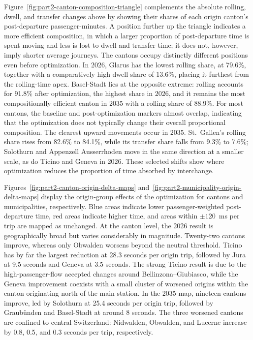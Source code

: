 \documentclass[preprint,12pt]{elsarticle}
\begin{document}
Figure~\ref{fig:part2-canton-composition-triangle} complements the absolute rolling, dwell, and transfer changes above by showing their shares of each origin canton's post-departure passenger-minutes. A position further up the triangle indicates a more efficient composition, in which a larger proportion of post-departure time is spent moving and less is lost to dwell and transfer time; it does not, however, imply shorter average journeys. The cantons occupy distinctly different positions even before optimization. In 2026, Glarus has the lowest rolling share, at 79.6\%, together with a comparatively high dwell share of 13.6\%, placing it furthest from the rolling-time apex. Basel-Stadt lies at the opposite extreme: rolling accounts for 91.8\% after optimization, the highest share in 2026, and it remains the most compositionally efficient canton in 2035 with a rolling share of 88.9\%. For most cantons, the baseline and post-optimization markers almost overlap, indicating that the optimization does not typically change their overall proportional composition. The clearest upward movements occur in 2035. St.~Gallen's rolling share rises from 82.6\% to 84.1\%, while its transfer share falls from 9.3\% to 7.6\%; Solothurn and Appenzell Ausserrhoden move in the same direction at a smaller scale, as do Ticino and Geneva in 2026. These selected shifts show where optimization reduces the proportion of time absorbed by interchange.



Figures~\ref{fig:part2-canton-origin-delta-maps} and~\ref{fig:part2-municipality-origin-delta-maps} display the origin-group effects of the optimization for cantons and municipalities, respectively. Blue areas indicate lower passenger-weighted post-departure time, red areas indicate higher time, and areas within \(\pm120\)~ms per trip are mapped as unchanged. At the canton level, the 2026 result is geographically broad but varies considerably in magnitude. Twenty-two cantons improve, whereas only Obwalden worsens beyond the neutral threshold. Ticino has by far the largest reduction at 28.3 seconds per origin trip, followed by Jura at 9.5 seconds and Geneva at 3.5 seconds. The strong Ticino result is due to the high-passenger-flow accepted changes around Bellinzona--Giubiasco, while the Geneva improvement coexists with a small cluster of worsened origins within the canton originating north of the main station. In the 2035 map, nineteen cantons improve, led by Solothurn at 25.4 seconds per origin trip, followed by Graubünden and Basel-Stadt at around 8 seconds. The three worsened cantons are confined to central Switzerland: Nidwalden, Obwalden, and Lucerne increase by 0.8, 0.5, and 0.3 seconds per trip, respectively.
\end{document}

